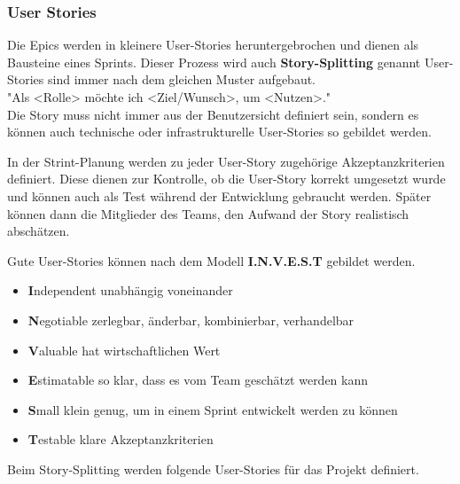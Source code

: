 \documentclass[a4paper, table]{article}
\begin{document}
\subsubsection{User Stories}\label{user-stories}
Die Epics werden in kleinere User-Stories heruntergebrochen und dienen als Bausteine eines Sprints.
Dieser Prozess wird auch \textbf{Story-Splitting} genannt
User-Stories sind immer nach dem gleichen Muster aufgebaut. \\
"Als <Rolle> möchte ich <Ziel/Wunsch>, um <Nutzen>." \\
Die Story muss nicht immer aus der Benutzersicht definiert sein, sondern es können auch technische oder
infrastrukturelle User-Stories so gebildet werden.

In der Strint-Planung werden zu jeder User-Story zugehörige Akzeptanzkriterien definiert.
Diese dienen zur Kontrolle, ob die User-Story korrekt umgesetzt wurde und
können auch als Test während der Entwicklung gebraucht werden.
Später können dann die Mitglieder des Teams, den Aufwand der Story realistisch abschätzen.

Gute User-Stories können nach dem Modell \textbf{I.N.V.E.S.T} gebildet werden. \autocite{hammerschall_software_2013} %
\begin{itemize}
    \item \textbf{I}ndependent  unabhängig voneinander
    \item \textbf{N}egotiable   zerlegbar, änderbar, kombinierbar, verhandelbar
    \item \textbf{V}aluable     hat wirtschaftlichen Wert
    \item \textbf{E}stimatable  so klar, dass es vom Team geschätzt werden kann
    \item \textbf{S}mall        klein genug, um in einem Sprint entwickelt werden zu können
    \item \textbf{T}estable     klare Akzeptanzkriterien
\end{itemize}

Beim Story-Splitting werden folgende User-Stories für das Projekt definiert.
\end{document}
